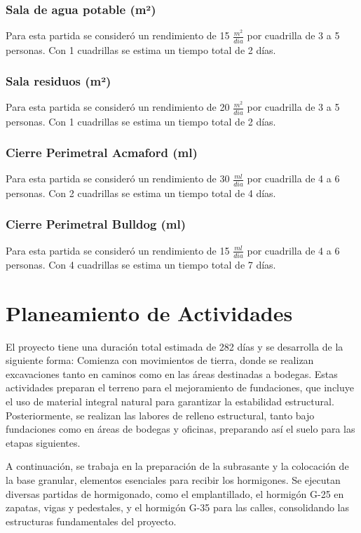 \documentclass{article} %
\begin{document}
\subsubsection{Sala de agua potable (m²)}
Para esta partida se consideró un rendimiento de 15 $\frac{m^2}{dia}$ por cuadrilla de 3 a 5 personas. Con 1 cuadrillas se estima un tiempo total de 2 días.

\subsubsection{Sala residuos (m²)}
Para esta partida se consideró un rendimiento de 20 $\frac{m^2}{dia}$ por cuadrilla de 3 a 5 personas. Con 1 cuadrillas se estima un tiempo total de 2 días.

\subsubsection{Cierre Perimetral Acmaford (ml)}
Para esta partida se consideró un rendimiento de 30 $\frac{ml}{dia}$ por cuadrilla de 4 a 6 personas. Con 2 cuadrillas se estima un tiempo total de 4 días.

\subsubsection{Cierre Perimetral Bulldog (ml)}
Para esta partida se consideró un rendimiento de 15 $\frac{ml}{dia}$ por cuadrilla de 4 a 6 personas. Con 4 cuadrillas se estima un tiempo total de 7 días.

\newpage

\section{Planeamiento de Actividades}

El proyecto tiene una duración total estimada de 282 días y se desarrolla de la siguiente forma: Comienza con movimientos de tierra, donde se realizan excavaciones tanto en caminos como en las áreas destinadas a bodegas. Estas actividades preparan el terreno para el mejoramiento de fundaciones, que incluye el uso de material integral natural para garantizar la estabilidad estructural. Posteriormente, se realizan las labores de relleno estructural, tanto bajo fundaciones como en áreas de bodegas y oficinas, preparando así el suelo para las etapas siguientes.

A continuación, se trabaja en la preparación de la subrasante y la colocación de la base granular, elementos esenciales para recibir los hormigones. Se ejecutan diversas partidas de hormigonado, como el emplantillado, el hormigón G-25 en zapatas, vigas y pedestales, y el hormigón G-35 para las calles, consolidando las estructuras fundamentales del proyecto. 
\end{document}
